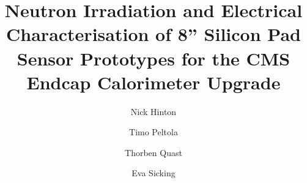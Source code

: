 \documentclass[a4paper,11pt]{article}
\title{\boldmath Neutron Irradiation and Electrical Characterisation of 8'' Silicon Pad Sensor Prototypes for the CMS Endcap Calorimeter Upgrade}
\author[a]{Nick Hinton}
\author[b]{Timo Peltola}
\author[c]{Thorben Quast}
\author[c]{Eva Sicking}
\affiliation[a]{Brown University}
\affiliation[b]{Texas Tech University}
\affiliation[c]{CERN Experimental Physics Department}
\begin{document}
\maketitle
\flushbottom

\linenumbers








\appendix





\end{document}
